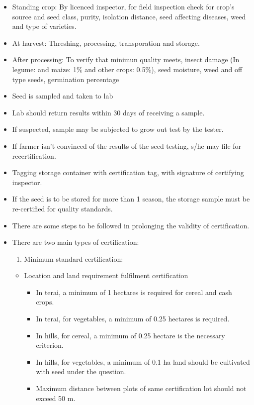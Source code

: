 \documentclass[
  openany]{book}
\providecommand{\tightlist}{%
  \setlength{\itemsep}{0pt}\setlength{\parskip}{0pt}}
\begin{document}
\begin{itemize}
\item
  Standing crop: By licenced inspector, for field inspection check for crop's source and seed class, purity, isolation distance, seed affecting diseases, weed and type of varieties.
\item
  At harvest: Threshing, processing, transporation and storage.
\item
  After processing: To verify that minimun quality meets, insect damage (In legume: and maize: 1\% and other crops: 0.5\%), seed moisture, weed and off type seeds, germination percentage
\item
  Seed is sampled and taken to lab
\item
  Lab should return results within 30 days of receiving a sample.
\item
  If suspected, sample may be subjected to grow out test by the tester.
\item
  If farmer isn't convinced of the results of the seed testing, s/he may file for recertification.
\item
  Tagging storage container with certification tag, with signature of certifying inspector.
\item
  If the seed is to be stored for more than 1 season, the storage sample must be re-certified for quality standards.
\item
  There are some steps to be followed in prolonging the validity of certification.
\item
  There are two main types of certification:

  \begin{enumerate}
  \def\labelenumi{\arabic{enumi}.}
  \tightlist
  \item
    Minimum standard certification:
  \end{enumerate}

  \begin{itemize}
  \tightlist
  \item
    Location and land requirement fulfilment certification

    \begin{itemize}
    \tightlist
    \item
      In terai, a minimum of 1 hectares is required for cereal and cash crops.
    \item
      In terai, for vegetables, a minimum of 0.25 hectares is required.
    \item
      In hills, for cereal, a minimum of 0.25 hectare is the necessary criterion.
    \item
      In hills, for vegetables, a minimum of 0.1 ha land should be cultivated with seed under the question.
    \item
      Maximum distance between plots of same certification lot should not exceed 50 m.
    \end{itemize}
  \end{itemize}


\end{itemize}
\end{document}
